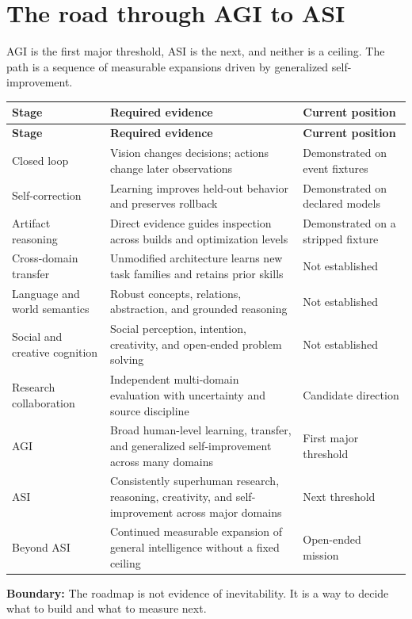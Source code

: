 \documentclass[11pt]{article}
\newcommand{\boundary}[1]{\par\smallskip\small\color{ZoeGray}\textbf{Boundary:} #1\normalsize\par\smallskip}
\begin{document}
\clearpage
\section{The road through AGI to ASI}

AGI is the first major threshold, ASI is the next, and neither is a ceiling. The path is a sequence of measurable expansions driven by generalized self-improvement.

\begin{longtable}{p{}p{}p{}}
\toprule
\textbf{Stage} & \textbf{Required evidence} & \textbf{Current position}\\
\midrule
\endfirsthead
\toprule
\textbf{Stage} & \textbf{Required evidence} & \textbf{Current position}\\
\midrule
\endhead
Closed loop & Vision changes decisions; actions change later observations & Demonstrated on event fixtures\\
Self-correction & Learning improves held-out behavior and preserves rollback & Demonstrated on declared models\\
Artifact reasoning & Direct evidence guides inspection across builds and optimization levels & Demonstrated on a stripped fixture\\
Cross-domain transfer & Unmodified architecture learns new task families and retains prior skills & Not established\\
Language and world semantics & Robust concepts, relations, abstraction, and grounded reasoning & Not established\\
Social and creative cognition & Social perception, intention, creativity, and open-ended problem solving & Not established\\
Research collaboration & Independent multi-domain evaluation with uncertainty and source discipline & Candidate direction\\
AGI & Broad human-level learning, transfer, and generalized self-improvement across many domains & First major threshold\\
ASI & Consistently superhuman research, reasoning, creativity, and self-improvement across major domains & Next threshold\\
Beyond ASI & Continued measurable expansion of general intelligence without a fixed ceiling & Open-ended mission\\
\bottomrule
\end{longtable}

\boundary{The roadmap is not evidence of inevitability. It is a way to decide what to build and what to measure next.}
\end{document}
